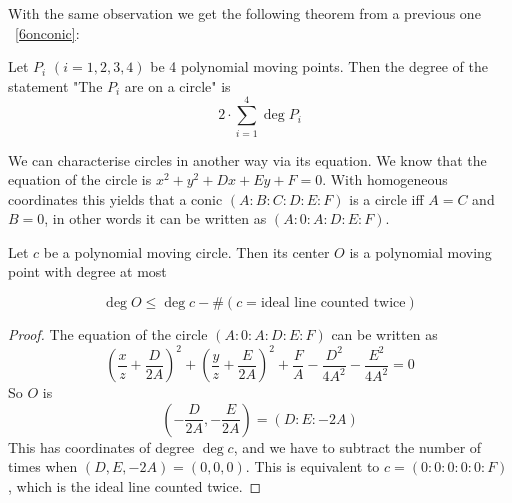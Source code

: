 \documentclass[a4paper]{article}
\begin{document}
With the same observation we get the following theorem from a previous one ~\ref{6onconic}:
\begin{theorem}
    Let $P_i$ $(i=1,2,3,4)$ be 4 polynomial moving points.
    Then the degree of the statement "The $P_i$ are on a circle" is
    $$2\cdot \sum_{i=1}^4 \deg P_i$$
\end{theorem}

We can characterise circles in another way via its equation. We know that the equation of the circle is $x^2+y^2+Dx+Ey+F=0$. With homogeneous coordinates this yields that a conic $(A:B:C:D:E:F)$ is a circle iff $A=C$ and $B=0$, in other words it can be written as $(A:0:A:D:E:F)$.

\begin{theorem}
    Let $c$ be a polynomial moving circle. Then its center $O$ is a polynomial moving point with degree at most

    $$\deg O\le\deg c-\#(c=\text{ideal line counted twice})$$
\end{theorem}
\begin{proof}
    The equation of the circle $(A:0:A:D:E:F)$ can be written as
    $$\left(\frac{x}{z}+\frac{D}{2A}\right)^2+\left(\frac{y}{z}+\frac{E}{2A}\right)^2+\frac{F}{A}-\frac{D^2}{4A^2}-\frac{E^2}{4A^2}=0$$
    So $O$ is
    $$\left(-\frac{D}{2A},-\frac{E}{2A}\right)=(D:E:-2A)$$
    This has coordinates of degree $\deg c$, and we have to subtract the number of times when $(D,E,-2A)=(0,0,0)$. This is equivalent to $c=(0:0:0:0:0:F)$, which is the ideal line counted twice.
\end{proof}
\end{document}
